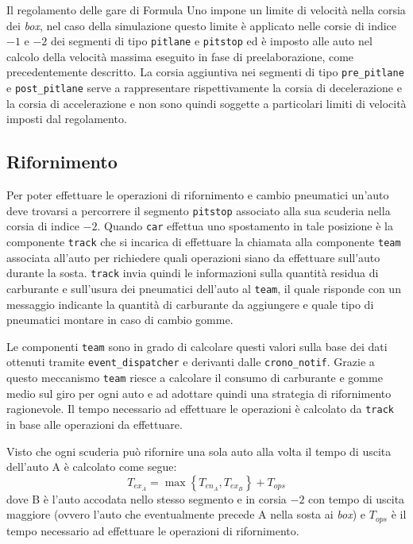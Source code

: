 Il regolamento delle gare di Formula Uno impone un limite di velocità nella corsia dei \textit{box}, nel caso della simulazione questo limite è applicato nelle corsie di indice $-1$ e $-2$ dei segmenti di tipo \texttt{pitlane} e \texttt{pitstop} ed è imposto alle auto nel calcolo della velocità massima eseguito in fase di preelaborazione, come precedentemente descritto.
La corsia aggiuntiva nei segmenti di tipo \texttt{pre\_pitlane} e \texttt{post\_pitlane} serve a rappresentare rispettivamente la corsia di decelerazione e la corsia di accelerazione e non sono quindi soggette a particolari limiti di velocità imposti dal regolamento.

\subsection{Rifornimento}
\label{sec:rifornimento}
Per poter effettuare le operazioni di rifornimento e cambio pneumatici un'auto deve trovarsi a percorrere il segmento \texttt{pitstop} associato alla sua scuderia nella corsia di indice $-2$. Quando \texttt{car} effettua uno spostamento in tale posizione è la componente \texttt{track} che si incarica di effettuare la chiamata alla componente \texttt{team} associata all'auto per richiedere quali operazioni siano da effettuare sull'auto durante la sosta. \texttt{track} invia quindi le informazioni sulla quantità residua di carburante e sull'usura dei pneumatici dell'auto al \texttt{team}, il quale risponde con un messaggio indicante la quantità di carburante da aggiungere e quale tipo di pneumatici montare in caso di cambio gomme.

Le componenti \texttt{team} sono in grado di calcolare questi valori sulla base dei dati ottenuti tramite \texttt{event\_dispatcher} e derivanti dalle \texttt{crono\_notif}. Grazie a questo meccanismo \texttt{team} riesce a calcolare il consumo di carburante e gomme medio sul giro per ogni auto e ad adottare quindi una strategia di rifornimento ragionevole.
Il tempo necessario ad effettuare le operazioni è calcolato da \texttt{track} in base alle operazioni da effettuare.

Visto che ogni scuderia può rifornire una sola auto alla volta il tempo di uscita dell'auto A è calcolato come segue:
\[ T_{ex_A} = \max \left\{ T_{en_A}, T_{ex_B} \right\} + T_{ops} \]
dove B è l'auto accodata nello stesso segmento e in corsia $-2$ con tempo di uscita maggiore (ovvero l'auto che eventualmente precede A nella sosta ai \textit{box}) e $T_{ops}$ è il tempo necessario ad effettuare le operazioni di rifornimento.

